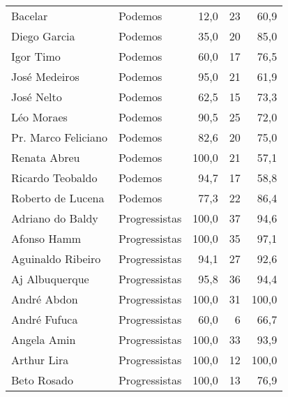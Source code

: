 \begin{longtable}{llrrr}
                             Bacelar &        Podemos &      12,0 &           23 &       60,9 \\
                        Diego Garcia &        Podemos &      35,0 &           20 &       85,0 \\
                           Igor Timo &        Podemos &      60,0 &           17 &       76,5 \\
                       José Medeiros &        Podemos &      95,0 &           21 &       61,9 \\
                          José Nelto &        Podemos &      62,5 &           15 &       73,3 \\
                          Léo Moraes &        Podemos &      90,5 &           25 &       72,0 \\
                 Pr. Marco Feliciano &        Podemos &      82,6 &           20 &       75,0 \\
                        Renata Abreu &        Podemos &     100,0 &           21 &       57,1 \\
                    Ricardo Teobaldo &        Podemos &      94,7 &           17 &       58,8 \\
                   Roberto de Lucena &        Podemos &      77,3 &           22 &       86,4 \\
                    Adriano do Baldy &  Progressistas &     100,0 &           37 &       94,6 \\
                         Afonso Hamm &  Progressistas &     100,0 &           35 &       97,1 \\
                   Aguinaldo Ribeiro &  Progressistas &      94,1 &           27 &       92,6 \\
                      Aj Albuquerque &  Progressistas &      95,8 &           36 &       94,4 \\
                         André Abdon &  Progressistas &     100,0 &           31 &      100,0 \\
                        André Fufuca &  Progressistas &      60,0 &            6 &       66,7 \\
                         Angela Amin &  Progressistas &     100,0 &           33 &       93,9 \\
                         Arthur Lira &  Progressistas &     100,0 &           12 &      100,0 \\
                         Beto Rosado &  Progressistas &     100,0 &           13 &       76,9 \\

\end{longtable}
